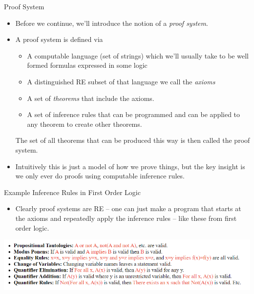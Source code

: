 \documentclass[aspectratio=169]{beamer}
\begin{document}
\begin{frame}{Proof System}
  
  \begin{itemize}
    \item Before we continue, we'll introduce the notion of a \emph{proof system}. \pause
    \item A proof system is defined via
    \begin{itemize}
        \item A computable language (set of strings) which we'll usually take to be well formed formulas expressed in some logic \pause
        \item A distinguished RE subset of that language we call the \emph{axioms}
        \item A set of \emph{theorems} that include the axioms. \pause
        \item A set of inference rules that can be programmed and can be applied to any theorem to create other theorems.
    \end{itemize}
    The set of all theorems that can be produced this way is then called the proof system. \pause
    \item Intuitively this is just a model of how we prove things, but the key insight is we only ever do proofs using computable inference rules.
  \end{itemize}
\end{frame}

\begin{frame}{Example Inference Rules in First Order Logic}
\begin{itemize}
    \item Clearly proof systems are RE -- one can just make a program that starts at the axioms and repeatedly apply the inference rules -- like these from first order logic. 
  \end{itemize}
  \begin{center}
    \includegraphics[width=1\textwidth]{Exinference.png}
  \end{center}
  
\end{frame}
\end{document}

